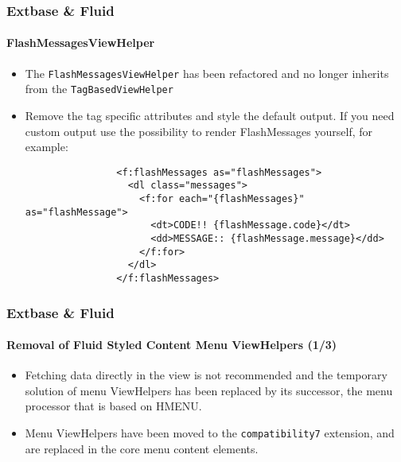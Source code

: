 
\begin{frame}[fragile]
	\frametitle{Extbase \& Fluid}
	\framesubtitle{FlashMessagesViewHelper}

	\lstset{basicstyle=\tiny\ttfamily}

	\begin{itemize}
		\item The \texttt{FlashMessagesViewHelper} has been refactored and no longer inherits
			from the \texttt{TagBasedViewHelper}

		\item Remove the tag specific attributes and style the default output.
			If you need custom output use the possibility to render FlashMessages yourself, for example:

			\begin{lstlisting}
				<f:flashMessages as="flashMessages">
				  <dl class="messages">
				    <f:for each="{flashMessages}" as="flashMessage">
				      <dt>CODE!! {flashMessage.code}</dt>
				      <dd>MESSAGE:: {flashMessage.message}</dd>
				    </f:for>
				  </dl>
				</f:flashMessages>
			\end{lstlisting}

	\end{itemize}

\end{frame}


\begin{frame}[fragile]
	\frametitle{Extbase \& Fluid}
	\framesubtitle{Removal of Fluid Styled Content Menu ViewHelpers (1/3)}

	\begin{itemize}
		\item Fetching data directly in the view is not recommended and
			the temporary solution of menu ViewHelpers has been replaced by
			its successor, the menu processor that is based on HMENU.

		\item Menu ViewHelpers have been moved to the \texttt{compatibility7}
			extension, and are replaced in the core menu content elements.

	\end{itemize}

\end{frame}

